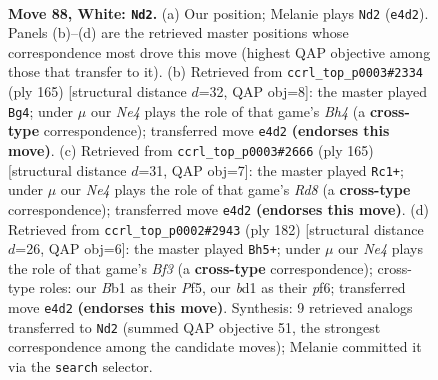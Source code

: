 \documentclass[11pt]{article}
\begin{document}
\clearpage

\begin{figure}[p]\centering
\begin{subfigure}{0.46\textwidth}\centering
\resizebox{\linewidth}{!}{%
\newchessgame
\chessboard[
  setfen={5r2/5p2/n1k3p1/4P2p/4NPp1/8/6KP/1B1b4 w - - 34 88},
  showmover=false,
  pgfstyle=straightmove, color=movearrow, markmove={e4-d2}
]}
\caption{}
\end{subfigure}\hfill
\begin{subfigure}{0.46\textwidth}\centering
\resizebox{\linewidth}{!}{%
\newchessgame
\chessboard[
  setfen={8/1p4K1/p3k3/P2pP2b/1P1P4/8/1B6/8 b - - 48 83},
  showmover=false,
  pgfstyle=straightmove, color=movearrow, markmove={h5-g4}
]}
\caption{}
\end{subfigure}
\\[4pt]
\begin{subfigure}{0.46\textwidth}\centering
\resizebox{\linewidth}{!}{%
\newchessgame
\chessboard[
  setfen={8/4k3/2K1p1p1/4P2p/5P1P/R5P1/8/3r4 b - - 18 83},
  showmover=false,
  pgfstyle=straightmove, color=movearrow, markmove={d1-c1}
]}
\caption{}
\end{subfigure}\hfill
\begin{subfigure}{0.46\textwidth}\centering
\resizebox{\linewidth}{!}{%
\newchessgame
\chessboard[
  setfen={2n1k3/8/3p1p1B/2p1pP2/1pP5/3P1B2/2K5/8 w - - 11 92},
  showmover=false,
  pgfstyle=straightmove, color=movearrow, markmove={f3-h5}
]}
\caption{}
\end{subfigure}
\caption{\textbf{Move 88, White: \texttt{Nd2}.} (a) Our position; Melanie plays \texttt{Nd2} (\texttt{e4d2}). Panels (b)--(d) are the retrieved master positions whose correspondence most drove this move (highest QAP objective among those that transfer to it). (b) Retrieved from \texttt{ccrl\_top\_p0003\#2334} (ply 165) [structural distance $d$=32, QAP obj=8]: the master played \texttt{Bg4}; under $\mu$ our \emph{Ne4} plays the role of that game's \emph{Bh4} (a \textbf{cross-type} correspondence); transferred move \texttt{e4d2} \textbf{(endorses this move)}. (c) Retrieved from \texttt{ccrl\_top\_p0003\#2666} (ply 165) [structural distance $d$=31, QAP obj=7]: the master played \texttt{Rc1+}; under $\mu$ our \emph{Ne4} plays the role of that game's \emph{Rd8} (a \textbf{cross-type} correspondence); transferred move \texttt{e4d2} \textbf{(endorses this move)}. (d) Retrieved from \texttt{ccrl\_top\_p0002\#2943} (ply 182) [structural distance $d$=26, QAP obj=6]: the master played \texttt{Bh5+}; under $\mu$ our \emph{Ne4} plays the role of that game's \emph{Bf3} (a \textbf{cross-type} correspondence); cross-type roles: our \emph{B}b1 as their \emph{P}f5, our \emph{b}d1 as their \emph{p}f6; transferred move \texttt{e4d2} \textbf{(endorses this move)}. Synthesis: 9 retrieved analogs transferred to \texttt{Nd2} (summed QAP objective 51, the strongest correspondence among the candidate moves); Melanie committed it via the \texttt{search} selector.}
\label{fig:thought-m174}
\end{figure}
\end{document}
